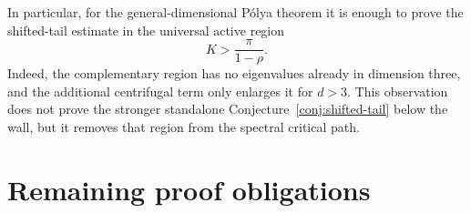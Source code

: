 \documentclass[11pt]{article}
\theoremstyle{remark}
\begin{document}
In particular, for the general-dimensional P\'olya theorem it is enough
to prove the shifted-tail estimate in the universal active region
\begin{equation}
 K>\frac\pi{1-\rho}.
 \label{eq:universal-active-region}
\end{equation}
Indeed, the complementary region has no eigenvalues already in dimension
three, and the additional centrifugal term only enlarges it for $d>3$.
This observation does not prove the stronger standalone
Conjecture~\ref{conj:shifted-tail} below the wall, but it removes that
region from the spectral critical path.

\section{Remaining proof obligations}
\end{document}
